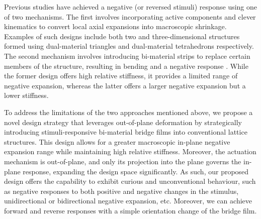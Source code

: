 \documentclass[final,times,5p]{elsarticle}
\numberwithin{equation}{section}
\begin{document}
Previous studies have achieved a negative (or reversed stimuli) response using one of two mechanisms. The first involves incorporating active components and clever kinematics to convert local axial expansions into macroscopic shrinkage. Examples of such designs include both two and three-dimensional structures formed using dual-material triangles \citep{wei2016planar,li2018hoberman,chen2022mechanical,huang2021auxetic} and dual-material tetrahedrons \citep{xu2018routes,xu2016structurally} respectively. The second mechanism involves introducing bi-material strips to replace certain members of the structure, resulting in bending and a negative response \citep{ha2015controllable,yu2019drastic,wu2016isotropic,wu2019mechanical}. While the former design offers high relative stiffness, it provides a limited range of negative expansion, whereas the latter offers a larger negative expansion but a lower stiffness.

To address the limitations of the two approaches mentioned above, we propose a novel design strategy that leverages out-of-plane deformation by strategically introducing stimuli-responsive bi-material bridge films into conventional lattice structures. This design allows for a greater macroscopic in-plane negative expansion range while maintaining high relative stiffness. 
Moreover, the actuation mechanism is out-of-plane, and only its projection into the plane governs the in-plane response, expanding the design space significantly. As such, our proposed design offers the capability to exhibit curious and unconventional behaviour, such as negative responses to both positive and negative changes in the stimulus, unidirectional or bidirectional negative expansion, etc. Moreover, we can achieve forward and reverse responses with a simple orientation change of the bridge film.


\end{document}
